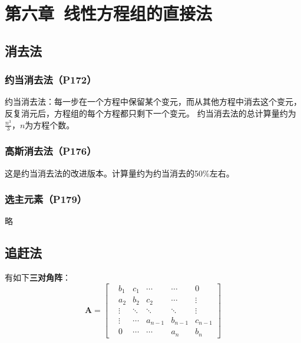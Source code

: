 \documentclass[fontset=ubuntu]{ctexart}
\numberwithin{equation}{section}
\numberwithin{theorem}{section}
\begin{document}

\section{第六章\ 线性方程组的直接法}

\begin{multicols}{2}
    \subsection{消去法}

    \subsubsection{约当消去法（P172）}

    约当消去法：每一步在一个方程中保留某个变元，而从其他方程中消去这个变元，反复消元后，方程组的每个方程都只剩下一个变元。
    约当消去法的总计算量约为$\frac{n^3}{3}$，$n$为方程个数。

    \subsubsection{高斯消去法（P176）}

    这是约当消去法的改进版本。计算量约为约当消去的50\%左右。

    \subsubsection{选主元素（P179）}

    略
    
    \subsection{追赶法}\label{zhuiganfa}

    有如下\textbf{三对角阵}：
    \begin{equation}
        \label{sanduijiaozhen}
        \mathbf{A}=
        \begin{bmatrix}
            &b_1  &c_1 &\cdots &\cdots &0 \\ 
            &a_2  &b_2 &c_2 &\cdots &\vdots \\
            &\vdots &\ddots &\ddots &\ddots &\vdots \\
            &\vdots &\cdots &a_{n-1} &b_{n-1} &c_{n-1} \\
            &0 &\cdots &\cdots &a_n &b_n 
        \end{bmatrix}
    \end{equation}


\end{multicols}
\end{document}
